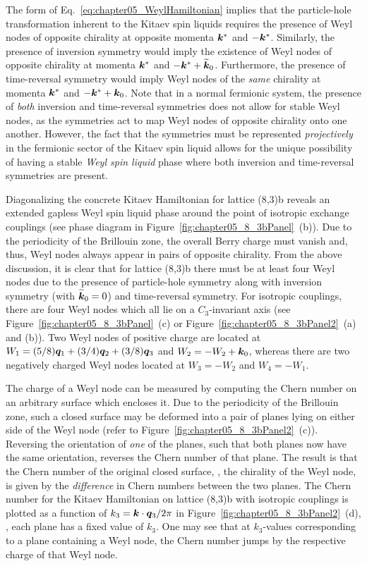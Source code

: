 The form of Eq.~\eqref{eq:chapter05_WeylHamiltonian} implies that the particle-hole transformation inherent to the Kitaev spin liquids requires the presence of Weyl nodes of opposite chirality at opposite momenta $\bm{k}^*$ and $-\bm{k}^*$.
Similarly, the presence of inversion symmetry would imply the existence of Weyl nodes of opposite chirality at momenta $\bm{k}^*$ and $-\bm{k}^* + \widetilde{\bm{k}}_0$.
Furthermore, the presence of time-reversal symmetry would imply Weyl nodes of the \textit{same} chirality at momenta $\bm{k}^*$ and $-\bm{k}^* + \bm{k}_0$.
Note that in a normal fermionic system, the presence of \textit{both} inversion and time-reversal symmetries does not allow for stable Weyl nodes, as the symmetries act to map Weyl nodes of opposite chirality onto one another.
However, the fact that the symmetries must be represented \textit{projectively} in the fermionic sector of the Kitaev spin liquid allows for the unique possibility of having a stable \textit{Weyl spin liquid} phase where both inversion and time-reversal symmetries are present.

Diagonalizing the concrete Kitaev Hamiltonian for lattice (8,3)b reveals an extended gapless Weyl spin liquid phase around the point of isotropic exchange couplings (see phase diagram in Figure~\ref{fig:chapter05_8_3bPanel}~(b)).
Due to the periodicity of the Brillouin zone, the overall Berry charge must vanish and, thus, Weyl nodes always appear in pairs of opposite chirality.
From the above discussion, it is clear that for lattice (8,3)b there must be at least four Weyl nodes due to the presence of particle-hole symmetry along with inversion symmetry (with $\widetilde{\bm{k}}_0 = 0$) and time-reversal symmetry.
For isotropic couplings, there are four Weyl nodes which all lie on a $C_3$-invariant axis (see Figure~\ref{fig:chapter05_8_3bPanel}~(c) or Figure~\ref{fig:chapter05_8_3bPanel2}~(a) and (b)).
Two Weyl nodes of positive charge are located at $W_1 = (5/8)\bm{q}_1 + (3/4)\bm{q}_2 + (3/8)\bm{q}_3$ and $W_2 = -W_2 + \bm{k}_0$, whereas there are two negatively charged Weyl nodes located at $W_3 = -W_2$ and $W_4 = -W_1$.

The charge of a Weyl node can be measured by computing the Chern number on an arbitrary surface which encloses it.
Due to the periodicity of the Brillouin zone, such a closed surface may be deformed into a pair of planes lying on either side of the Weyl node (refer to Figure~\ref{fig:chapter05_8_3bPanel2}~(c)).
Reversing the orientation of \textit{one} of the planes, such that both planes now have the same orientation, reverses the Chern number of that plane.
The result is that the Chern number of the original closed surface, \ie, the chirality of the Weyl node, is given by the \textit{difference} in Chern numbers between the two planes.
The Chern number for the Kitaev Hamiltonian on lattice (8,3)b with isotropic couplings is plotted as a function of $k_3 = \bm{k} \cdot \bm{q}_3 / 2\pi$ in Figure~\ref{fig:chapter05_8_3bPanel2}~(d), \ie, each plane has a fixed value of $k_3$.
One may see that at $k_3$-values corresponding to a plane containing a Weyl node, the Chern number jumps by the respective charge of that Weyl node.

